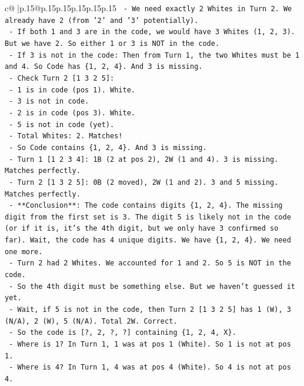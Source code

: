 \documentclass{article}
\begin{document}
{\begin{supertabular}{c@{$\;$}|p{.15\linewidth}@{}p{.15\linewidth}p{.15\linewidth}p{.15\linewidth}p{.15\linewidth}p{.15\linewidth}}
{{{\texttt{      {-} We need exactly 2 Whites in Turn 2. We already have 2 (from '2' and '3' potentially).} \\
\texttt{      {-} If both 1 and 3 are in the code, we would have 3 Whites (1, 2, 3). But we have 2. So either 1 or 3 is NOT in the code.} \\
\texttt{      {-} If 3 is not in the code: Then from Turn 1, the two Whites must be 1 and 4. So Code has \{1, 2, 4\}. And 3 is missing.} \\
\texttt{        {-} Check Turn 2 {[}1 3 2 5{]}:} \\
\texttt{          {-} 1 is in code (pos 1). White.} \\
\texttt{          {-} 3 is not in code.} \\
\texttt{          {-} 2 is in code (pos 3). White.} \\
\texttt{          {-} 5 is not in code (yet).} \\
\texttt{          {-} Total Whites: 2. Matches!} \\
\texttt{        {-} So Code contains \{1, 2, 4\}. And 3 is missing.} \\
\texttt{        {-} Turn 1 {[}1 2 3 4{]}: 1B (2 at pos 2), 2W (1 and 4). 3 is missing. Matches perfectly.} \\
\texttt{        {-} Turn 2 {[}1 3 2 5{]}: 0B (2 moved), 2W (1 and 2). 3 and 5 missing. Matches perfectly.} \\
\texttt{      {-} **Conclusion**: The code contains digits \{1, 2, 4\}. The missing digit from the first set is 3. The digit 5 is likely not in the code (or if it is, it's the 4th digit, but we only have 3 confirmed so far). Wait, the code has 4 unique digits. We have \{1, 2, 4\}. We need one more.} \\
\texttt{      {-} Turn 2 had 2 Whites. We accounted for 1 and 2. So 5 is NOT in the code.} \\
\texttt{      {-} So the 4th digit must be something else. But we haven't guessed it yet.} \\
\texttt{      {-} Wait, if 5 is not in the code, then Turn 2 {[}1 3 2 5{]} has 1 (W), 3 (N/A), 2 (W), 5 (N/A). Total 2W. Correct.} \\
\texttt{      {-} So the code is {[}?, 2, ?, ?{]} containing \{1, 2, 4, X\}.} \\
\texttt{      {-} Where is 1? In Turn 1, 1 was at pos 1 (White). So 1 is not at pos 1.} \\
\texttt{      {-} Where is 4? In Turn 1, 4 was at pos 4 (White). So 4 is not at pos 4.} \\
}}}
\end{supertabular}}
\end{document}
